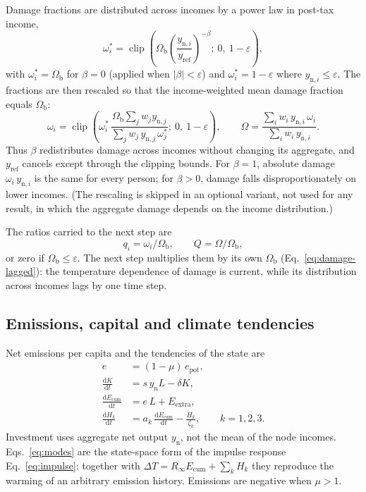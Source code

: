 \documentclass[11pt]{article}
\newcommand{\clip}{\operatorname{clip}}
\newcommand{\dd}{\mathrm{d}}
\newcommand{\yn}{y_{\mathrm{n}}}
\newcommand{\Ecum}{E_{\mathrm{cum}}}
\newcommand{\epot}{e_{\mathrm{pot}}}
\newcommand{\Omb}{\Omega_{\mathrm{b}}}
\newcommand{\yref}{y_{\mathrm{ref}}}
\begin{document}
Damage fractions are distributed across incomes by a power law in post-tax
income,
\begin{equation}
  \omega_i^{*} = \clip\!\left(\Omb\left(\frac{y_{\mathrm{n},i}}{\yref}\right)^{-\beta};\
  0,\ 1-\varepsilon\right),
  \label{eq:damage-powerlaw}
\end{equation}
with $\omega_i^{*} = \Omb$ for $\beta = 0$ (applied when $|\beta|<\varepsilon$)
and $\omega_i^{*} = 1-\varepsilon$ where $y_{\mathrm{n},i}\le\varepsilon$. The
fractions are then rescaled so that the income-weighted mean damage fraction
equals $\Omb$:
\begin{equation}
  \omega_i = \clip\!\left(\omega_i^{*}\,
  \frac{\Omb\sum_j w_j y_{\mathrm{n},j}}{\sum_j w_j\,y_{\mathrm{n},j}\,\omega_j^{*}};\
  0,\ 1-\varepsilon\right),
  \qquad
  \Omega = \frac{\sum_i w_i\,y_{\mathrm{n},i}\,\omega_i}{\sum_i w_i\,y_{\mathrm{n},i}} .
  \label{eq:damage-rescale}
\end{equation}
Thus $\beta$ redistributes damage across incomes without changing its
aggregate, and $\yref$ cancels except through the clipping bounds. For
$\beta = 1$, absolute damage $\omega_i\,y_{\mathrm{n},i}$ is the same for every
person; for $\beta > 0$, damage falls disproportionately on lower incomes.
(The rescaling is skipped in an optional variant, not used for any result, in
which the aggregate damage depends on the income distribution.)

The ratios carried to the next step are
\begin{equation}
  q_i = \omega_i/\Omb, \qquad Q = \Omega/\Omb,
\end{equation}
or zero if $\Omb\le\varepsilon$. The next step multiplies them by its own
$\Omb$ (Eq.~\ref{eq:damage-lagged}): the temperature dependence of damage is
current, while its distribution across incomes lags by one time step.

\subsection{Emissions, capital and climate tendencies}

Net emissions per capita and the tendencies of the state are
\begin{align}
  e &= (1-\mu)\,\epot , \\
  \frac{\dd K}{\dd t} &= s\,\yn L - \delta K , \label{eq:capital}\\
  \frac{\dd\Ecum}{\dd t} &= e\,L + E_{\mathrm{extra}} , \\
  \frac{\dd H_k}{\dd t} &= a_k\,\frac{\dd\Ecum}{\dd t} - \frac{H_k}{\zeta_k},
  \qquad k = 1,2,3 . \label{eq:modes}
\end{align}
Investment uses aggregate net output $\yn$, not the mean of the node incomes.
Eqs.~\eqref{eq:modes} are the state-space form of the impulse response
Eq.~\eqref{eq:impulse}: together with $\Delta T = R_\infty\Ecum + \sum_k H_k$
they reproduce the warming of an arbitrary emission history. Emissions are
negative when $\mu > 1$.
\end{document}

